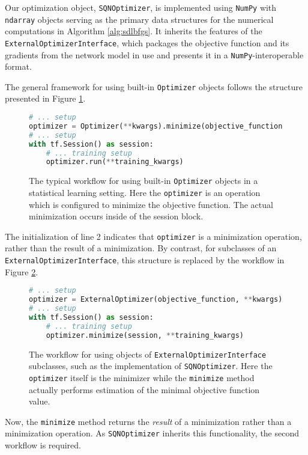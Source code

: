 \documentclass{article}
\begin{document}
Our optimization object, \texttt{SQNOptimizer}, is implemented using
\texttt{NumPy} \cite{numpy} with \texttt{ndarray} objects serving as the primary
data structures for the numerical computations in Algorithm \ref{alg:sdlbfgs}.
It inherits the features of the \texttt{ExternalOptimizerInterface}, which
packages the objective function and its gradients from the network model in use
and presents it in a \texttt{NumPy}-interoperable format. 

The general framework for using built-in \texttt{Optimizer} objects follows the
structure presented in Figure \ref{fig:typical}.
\begin{figure}[h]
  \begin{lstlisting}[language=Python]
# ... setup
optimizer = Optimizer(**kwargs).minimize(objective_function)
# ... setup
with tf.Session() as session:
    # ... training setup
    optimizer.run(**training_kwargs)
  \end{lstlisting}
  \caption{The typical workflow for using built-in \texttt{Optimizer} objects in
    a statistical learning setting. Here the \texttt{optimizer} is an operation
    which is configured to minimize the objective function. The actual
  minimization occurs inside of the session block.}
  \label{fig:typical}
\end{figure}
The initialization of line 2 indicates that \texttt{optimizer} is a minimization
operation, rather than the result of a minimization. By contrast, for subclasses
of an \texttt{ExternalOptimizerInterface}, this structure is replaced by the
workflow in Figure \ref{fig:external}.
\begin{figure}[h]
  \begin{lstlisting}[language=Python]
# ... setup
optimizer = ExternalOptimizer(objective_function, **kwargs)
# ... setup
with tf.Session() as session:
    # ... training setup
    optimizer.minimize(session, **training_kwargs)
  \end{lstlisting}
  \caption{%
    The workflow for using objects of 
  \texttt{ExternalOptimizerInterface} subclasses, such as the implementation of
  \texttt{SQNOptimizer}. Here the \texttt{optimizer} itself is the minimizer while
  the \texttt{minimize} method actually performs estimation of the minimal
  objective function value.  }
  \label{fig:external}
\end{figure}

Now, the \texttt{minimize} method returns the \emph{result} of a minimization
rather than a minimization operation. As \texttt{SQNOptimizer} inherits this
functionality, the second workflow is required. 
\end{document}
